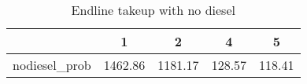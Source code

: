 \begin{table}[htbp]\centering
\caption{Endline takeup with no diesel\label {tab1}}
\begin{tabular}{l*{4}{c}}
\toprule
            &           1&           2&           4&           5\\
\midrule
nodiesel\_prob&     1462.86&     1181.17&      128.57&      118.41\\
\bottomrule
\end{tabular}
\end{table}
